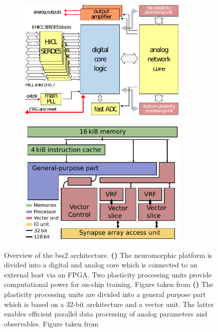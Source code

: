 \begin{figure}
	\begin{subfigure}[c]{0.5\textwidth}
		\centering
		\caption{}
		\includegraphics[width=0.9\textwidth]{figures/bss2architecture_wtext.pdf}
		\label{hxstructure}
	\end{subfigure}	
	\begin{subfigure}[c]{0.5\textwidth}
		\centering
		\caption{}
		\includegraphics[width=0.9\textwidth]{figures/ppu_overview.pdf}
		\label{hxppu}
	\end{subfigure}
	\caption[Overview of the \gls{bss2} architecture.]{Overview of the \gls{bss2} architecture. \textbf{()} The neuromorphic platform is divided into a digital and analog core which is connected to an external host via an FPGA. Two plasticity processing units provide computational power for on-chip training.  Figure taken from \citealp{schemmel2017internal} \textbf{()} The plasticity processing units are divided into a general purpose part which is based on a 32-bit architecture and a vector unit. The latter enables efficient parallel data processing of analog parameters and observables. Figure taken from \citealp{friedmann2016hybridlearning}}
\end{figure}

